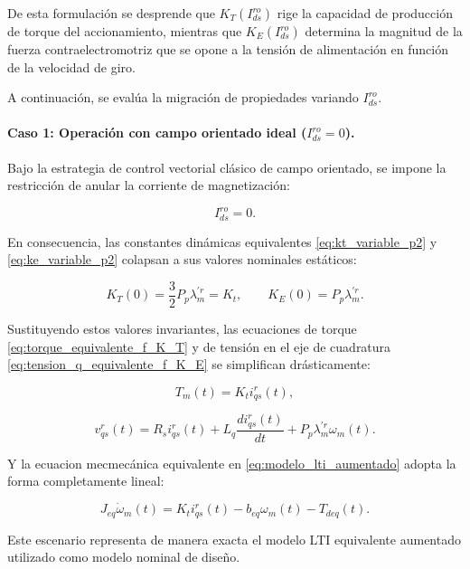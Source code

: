 \documentclass[10pt,a4paper]{article}
\begin{document}
De esta formulación se desprende que $K_T(I_{ds}^{ro})$ rige la capacidad de producción de torque del accionamiento, 
mientras que $K_E(I_{ds}^{ro})$ determina la magnitud de la fuerza contraelectromotriz que se opone a la tensión de alimentación en función de la velocidad de giro.

A continuación, se evalúa la migración de propiedades variando $I_{ds}^{ro}$.

\paragraph{Caso 1: Operación con campo orientado ideal ($I_{ds}^{ro}=0$).}
Bajo la estrategia de control vectorial clásico de campo orientado, se impone la restricción de anular la corriente de magnetización:

\begin{equation*}
    I_{ds}^{ro}=0.
\end{equation*}

En consecuencia, las constantes dinámicas equivalentes \eqref{eq:kt_variable_p2} y \eqref{eq:ke_variable_p2} colapsan a sus valores nominales estáticos:

\begin{equation*}
	K_T(0)=
	\frac{3}{2}P_p\lambda_m^{\prime r}=K_t,
	\qquad
	K_E(0)=P_p\lambda_m^{\prime r}.
\end{equation*}

Sustituyendo estos valores invariantes, las ecuaciones de torque \eqref{eq:torque_equivalente_f_K_T} y de tensión en el eje de cuadratura \eqref{eq:tension_q_equivalente_f_K_E} 
se simplifican drásticamente:

\begin{equation*}
	T_m(t)=K_t i_{qs}^{r}(t),
\end{equation*}

\begin{equation*}
	v_{qs}^{r}(t)=
	R_s i_{qs}^{r}(t)
	+
	L_q\frac{di_{qs}^{r}(t)}{dt}
	+
	P_p\lambda_m^{\prime r}\omega_m(t).
\end{equation*}

Y la ecuacion mecmecánica equivalente en \eqref{eq:modelo_lti_aumentado} adopta la forma completamente lineal:

\begin{equation*}
	J_{eq}\dot{\omega}_m(t)=
	K_t i_{qs}^{r}(t)
	-
	b_{eq}\omega_m(t)
	-
	T_{deq}(t).
\end{equation*}

Este escenario representa de manera exacta el modelo LTI equivalente aumentado utilizado como modelo nominal de diseño.
\end{document}
